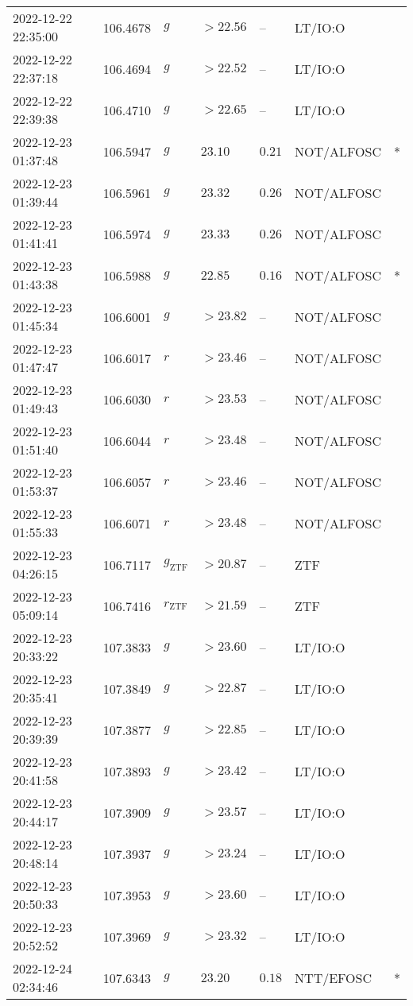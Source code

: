 \documentclass{nature_plusfigure}
\begin{document}
\begin{supplement}
\begin{center}
\begin{longtable}{lllllll}
2022-12-22 22:35:00 & 106.4678 & $g$ & $>22.56$ & -- & LT/IO:O &  \\ 
2022-12-22 22:37:18 & 106.4694 & $g$ & $>22.52$ & -- & LT/IO:O &  \\ 
2022-12-22 22:39:38 & 106.4710 & $g$ & $>22.65$ & -- & LT/IO:O &  \\ 
2022-12-23 01:37:48 & 106.5947 & $g$ & $23.10$ & $0.21$ & NOT/ALFOSC & * \\ 
2022-12-23 01:39:44 & 106.5961 & $g$ & $23.32$ & $0.26$ & NOT/ALFOSC &  \\ 
2022-12-23 01:41:41 & 106.5974 & $g$ & $23.33$ & $0.26$ & NOT/ALFOSC &  \\ 
2022-12-23 01:43:38 & 106.5988 & $g$ & $22.85$ & $0.16$ & NOT/ALFOSC & * \\ 
2022-12-23 01:45:34 & 106.6001 & $g$ & $>23.82$ & -- & NOT/ALFOSC &  \\ 
2022-12-23 01:47:47 & 106.6017 & $r$ & $>23.46$ & -- & NOT/ALFOSC &  \\ 
2022-12-23 01:49:43 & 106.6030 & $r$ & $>23.53$ & -- & NOT/ALFOSC &  \\ 
2022-12-23 01:51:40 & 106.6044 & $r$ & $>23.48$ & -- & NOT/ALFOSC &  \\ 
2022-12-23 01:53:37 & 106.6057 & $r$ & $>23.46$ & -- & NOT/ALFOSC &  \\ 
2022-12-23 01:55:33 & 106.6071 & $r$ & $>23.48$ & -- & NOT/ALFOSC &  \\ 
2022-12-23 04:26:15 & 106.7117 & ${g}_\mathrm{ZTF}$ & $>20.87$ & -- & ZTF &  \\ 
2022-12-23 05:09:14 & 106.7416 & ${r}_\mathrm{ZTF}$ & $>21.59$ & -- & ZTF &  \\ 
2022-12-23 20:33:22 & 107.3833 & $g$ & $>23.60$ & -- & LT/IO:O &  \\ 
2022-12-23 20:35:41 & 107.3849 & $g$ & $>22.87$ & -- & LT/IO:O &  \\ 
2022-12-23 20:39:39 & 107.3877 & $g$ & $>22.85$ & -- & LT/IO:O &  \\ 
2022-12-23 20:41:58 & 107.3893 & $g$ & $>23.42$ & -- & LT/IO:O &  \\ 
2022-12-23 20:44:17 & 107.3909 & $g$ & $>23.57$ & -- & LT/IO:O &  \\ 
2022-12-23 20:48:14 & 107.3937 & $g$ & $>23.24$ & -- & LT/IO:O &  \\ 
2022-12-23 20:50:33 & 107.3953 & $g$ & $>23.60$ & -- & LT/IO:O &  \\ 
2022-12-23 20:52:52 & 107.3969 & $g$ & $>23.32$ & -- & LT/IO:O &  \\ 
2022-12-24 02:34:46 & 107.6343 & $g$ & $23.20$ & $0.18$ & NTT/EFOSC & * \\ 

\end{longtable}
\end{center}
\end{supplement}
\end{document}
